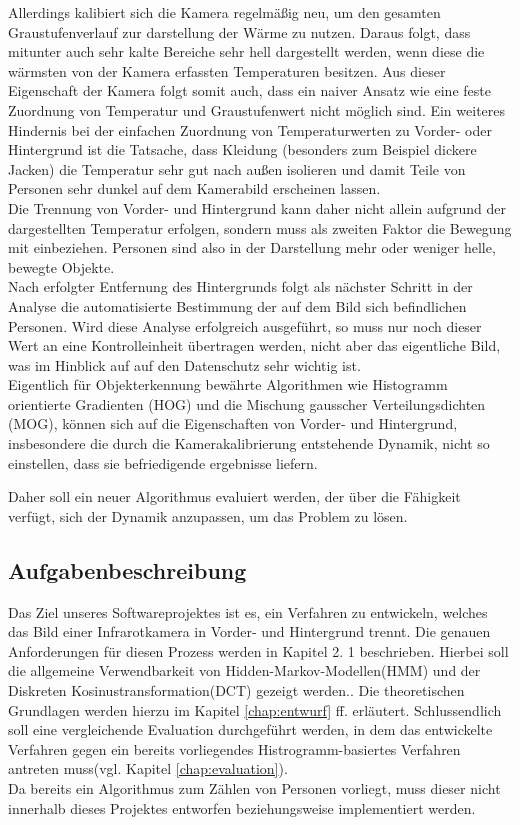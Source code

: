 Allerdings kalibiert sich die Kamera regelmäßig neu, um den gesamten Graustufenverlauf zur darstellung der Wärme zu nutzen. Daraus folgt, dass mitunter auch sehr kalte Bereiche sehr hell dargestellt werden, wenn diese die wärmsten von der Kamera erfassten Temperaturen besitzen.
Aus dieser Eigenschaft der Kamera folgt somit auch, dass ein naiver Ansatz wie eine feste Zuordnung von Temperatur und Graustufenwert nicht möglich sind. Ein weiteres Hindernis bei der einfachen Zuordnung von Temperaturwerten zu Vorder- oder Hintergrund ist die Tatsache, dass Kleidung (besonders zum Beispiel dickere Jacken) die Temperatur sehr gut nach außen isolieren und damit Teile von Personen sehr dunkel auf dem Kamerabild erscheinen lassen.\\
Die Trennung von Vorder- und Hintergrund kann daher nicht allein aufgrund der dargestellten Temperatur erfolgen, sondern muss als zweiten Faktor die Bewegung mit einbeziehen.
Personen sind also in der Darstellung mehr oder weniger helle, bewegte Objekte.\\
Nach erfolgter Entfernung des Hintergrunds folgt als nächster Schritt in der Analyse die automatisierte Bestimmung der auf dem Bild sich befindlichen Personen.
Wird diese Analyse erfolgreich ausgeführt, so muss nur noch dieser Wert an eine Kontrolleinheit übertragen werden, nicht aber das eigentliche Bild, was im Hinblick auf auf den Datenschutz sehr wichtig ist.\\
Eigentlich für Objekterkennung bewährte Algorithmen wie Histogramm orientierte Gradienten (HOG)\cite{Dalal05histogramsof} und die Mischung gausscher Verteilungsdichten (MOG)\cite{DBLP:conf/focs/Dasgupta99}, können sich auf die Eigenschaften von Vorder- und Hintergrund, insbesondere die durch die Kamerakalibrierung entstehende Dynamik, nicht so einstellen, dass sie befriedigende ergebnisse liefern.

Daher soll ein neuer Algorithmus evaluiert werden, der über die Fähigkeit verfügt, sich der Dynamik anzupassen, um das Problem zu lösen.\\


\subsection{Aufgabenbeschreibung}
\label{sec:aufgabenbeschr}

Das Ziel unseres Softwareprojektes ist es, ein Verfahren zu entwickeln, welches das Bild einer Infrarotkamera in Vorder- und Hintergrund trennt.
 Die genauen Anforderungen für diesen Prozess werden in Kapitel 2.
1 beschrieben.
 Hierbei soll die allgemeine Verwendbarkeit von Hidden-Markov-Modellen(HMM)\cite{Stamp04arevealing} und der Diskreten Kosinustransformation(DCT)\cite{Khayam03thediscrete} gezeigt werden..
 Die theoretischen Grundlagen werden hierzu im Kapitel \ref{chap:entwurf} ff. erläutert.
 Schlussendlich soll eine vergleichende Evaluation durchgeführt werden, in dem das entwickelte Verfahren gegen ein bereits vorliegendes Histrogramm-basiertes Verfahren antreten muss(vgl. Kapitel \ref{chap:evaluation}).\\
Da bereits ein Algorithmus zum Zählen von Personen vorliegt, muss dieser nicht innerhalb dieses Projektes entworfen beziehungsweise implementiert werden.

